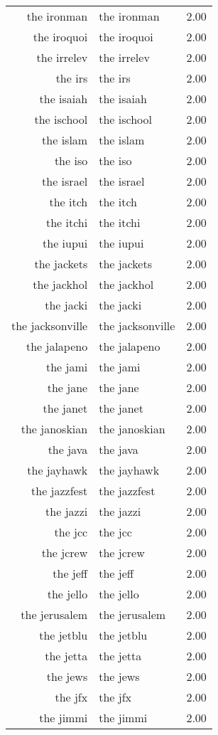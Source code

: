 \begin{table}[ht]
\begin{tabular}{rlr}
  the ironman & the ironman & 2.00 \\ 
  the iroquoi & the iroquoi & 2.00 \\ 
  the irrelev & the irrelev & 2.00 \\ 
  the irs & the irs & 2.00 \\ 
  the isaiah & the isaiah & 2.00 \\ 
  the ischool & the ischool & 2.00 \\ 
  the islam & the islam & 2.00 \\ 
  the iso & the iso & 2.00 \\ 
  the israel & the israel & 2.00 \\ 
  the itch & the itch & 2.00 \\ 
  the itchi & the itchi & 2.00 \\ 
  the iupui & the iupui & 2.00 \\ 
  the jackets & the jackets & 2.00 \\ 
  the jackhol & the jackhol & 2.00 \\ 
  the jacki & the jacki & 2.00 \\ 
  the jacksonville & the jacksonville & 2.00 \\ 
  the jalapeno & the jalapeno & 2.00 \\ 
  the jami & the jami & 2.00 \\ 
  the jane & the jane & 2.00 \\ 
  the janet & the janet & 2.00 \\ 
  the janoskian & the janoskian & 2.00 \\ 
  the java & the java & 2.00 \\ 
  the jayhawk & the jayhawk & 2.00 \\ 
  the jazzfest & the jazzfest & 2.00 \\ 
  the jazzi & the jazzi & 2.00 \\ 
  the jcc & the jcc & 2.00 \\ 
  the jcrew & the jcrew & 2.00 \\ 
  the jeff & the jeff & 2.00 \\ 
  the jello & the jello & 2.00 \\ 
  the jerusalem & the jerusalem & 2.00 \\ 
  the jetblu & the jetblu & 2.00 \\ 
  the jetta & the jetta & 2.00 \\ 
  the jews & the jews & 2.00 \\ 
  the jfx & the jfx & 2.00 \\ 
  the jimmi & the jimmi & 2.00 \\ 

\end{tabular}
\end{table}
